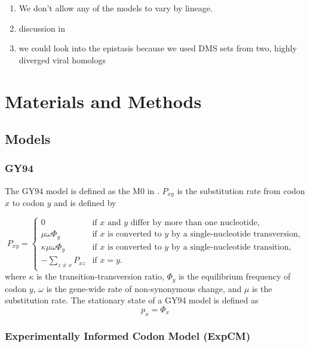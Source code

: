 \documentclass[11pt]{article}
\begin{document}
\begin{enumerate}
  \item We don't allow any of the models to vary by lineage. 
  \item discussion in \citet{rodrigue2010mutation}
  \item we could look into the epistasis because we used DMS sets from two, highly diverged viral homologs
\end{enumerate}

\section*{Materials and Methods}

\subsection*{Models}

\subsubsection*{GY94}

The GY94 model is defined as the M0 in \cite{yang2000codon}. 
$P_{xy}$ is the substitution rate from codon $x$ to codon $y$ and is defined by

\begin{equation}
\label{eq:GY94}
P_{xy} = 
\begin{cases}
  0 & \mbox{if $x$ and $y$ differ by more than one nucleotide,}\\
  \mu \omega \Phi_{y} & \mbox{if $x$ is converted to $y$ by a single-nucleotide transversion,} \\
  \kappa \mu \omega \Phi_{y} & \mbox{if $x$ is converted to $y$ by a single-nucleotide transition,} \\
  -\sum\limits_{z \ne x} P_{xz} & \mbox{if $x = y$.}
  \end{cases}
\end{equation}
where $\kappa$ is the transition-transversion ratio, $\Phi_y$ is the equilibrium frequency of
codon $y$, $\omega$ is the gene-wide rate of non-synonymous change, and $\mu$ is the substitution rate.
The stationary state of a GY94 model is defined as 
\begin{equation}
\label{eq:px}
p_{x} = \Phi_x
\end{equation}

\subsubsection*{Experimentally Informed Codon Model (ExpCM)}
\end{document}
